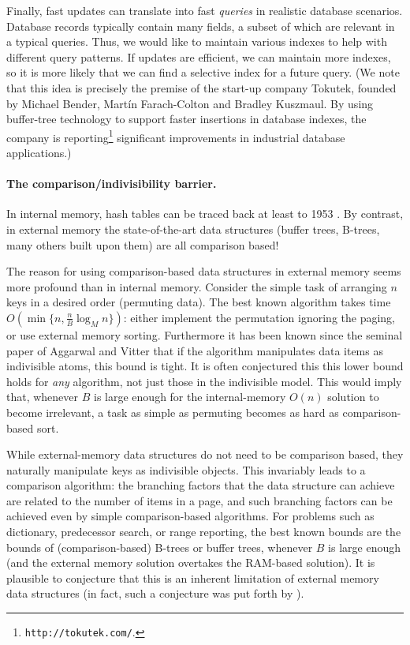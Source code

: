 \documentclass[letterpaper,11pt]{article}
\begin{document}
Finally, fast updates can translate into fast \emph{queries} in
realistic database scenarios. Database records typically contain many
fields, a subset of which are relevant in a typical queries. Thus, we
would like to maintain various indexes to help with different query
patterns. If updates are efficient, we can maintain more indexes, so
it is more likely that we can find a selective index for a future
query. (We note that this idea is precisely the premise of the
start-up company Tokutek, founded by Michael Bender, Mart\'in
Farach-Colton and Bradley Kuszmaul. By using buffer-tree technology to
support faster insertions in database indexes, the company is
reporting\footnote{{\tt http://tokutek.com/}.}
significant improvements in industrial database applications.)


\paragraph{The comparison/indivisibility barrier.}
In internal memory, hash tables can be traced back at least to 1953
\cite{knuth-vol3}. By contrast, in external memory the
state-of-the-art data structures (buffer trees, B-trees, many others
built upon them) are all comparison based!

The reason for using comparison-based data structures in external
memory seems more profound than in internal memory. Consider the
simple task of arranging $n$ keys in a desired order (permuting
data). The best known algorithm takes time $O(\min \{ n, \frac{n}{B}
\log_M n \})$: either implement the permutation ignoring the paging,
or use external memory sorting. Furthermore it has been known since
the seminal paper of Aggarwal and Vitter \cite{aggarwal88extmem} that
if the algorithm manipulates data items as indivisible atoms, this
bound is tight. It is often conjectured this this lower bound holds
for \emph{any} algorithm, not just those in the indivisible
model. This would imply that, whenever $B$ is large enough for the
internal-memory $O(n)$ solution to become irrelevant, a task as simple
as permuting becomes as hard as comparison-based sort.

While external-memory data structures do not need to be comparison
based, they naturally manipulate keys as indivisible objects. This
invariably leads to a comparison algorithm: the branching factors that
the data structure can achieve are related to the number of items in a
page, and such branching factors can be achieved even by simple
comparison-based algorithms. For problems such as dictionary,
predecessor search, or range reporting, the best known bounds are the
bounds of (comparison-based) B-trees or buffer trees, whenever $B$ is
large enough (and the external memory solution overtakes the RAM-based
solution). It is plausible to conjecture that this is an inherent
limitation of external memory data structures (in fact, such a
conjecture was put forth by \cite{yi10dagstuhl}).
\end{document}
